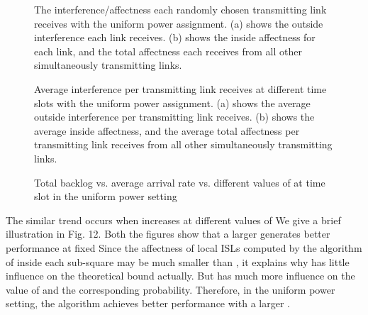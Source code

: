 \documentclass[journal]{IEEEtran}
\begin{document}
\begin{figure}[htpb]
 \centering
\centering
  \hspace{0cm}
 \hfill
     \caption{{\small{The interference/affectness each randomly chosen transmitting link receives with the uniform power assignment. (a) shows the outside interference each link receives. (b) shows the inside affectness for each link, and the total affectness each receives from all other simultaneously transmitting links.}}}
\end{figure}

\begin{figure}
\centering
  \hspace{0cm}
  \hfill
     \caption{{\small{Average interference per transmitting link receives at different time slots with the uniform power assignment. (a) shows the average outside interference  per transmitting link receives. (b) shows the average inside affectness, and the average total affectness per transmitting link receives from all other simultaneously transmitting links.} }}
\end{figure}

\begin{figure*}[htpb]
    \centering
  \hspace{0cm}
  \hspace{0cm}
   \caption{{\small{Total backlog vs. average arrival rate  vs. different values of   at time slot  in the uniform power setting}}}
\end{figure*}

The similar trend occurs when  increases at different values of  We give a brief illustration in Fig. 12. Both the figures show that a larger  generates better performance at fixed 
Since the affectness of local ISLs computed by the algorithm of \cite{S:phy9} inside each sub-square may be much smaller than , it explains why  has little influence on the theoretical bound actually. But  has much more influence on the value of  and the corresponding probability. Therefore, in the uniform power setting, the algorithm achieves better performance with a larger .
\end{document}
